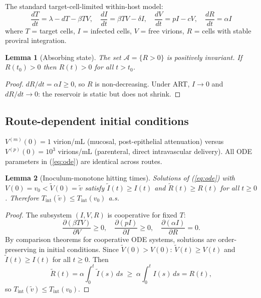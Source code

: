 \documentclass[11pt]{article}
\newtheorem{lemma}{Lemma}[section]
\theoremstyle{definition}
\theoremstyle{remark}
\newcommand{\Tint}{T_{\text{int}}}
\begin{document}
The standard target-cell-limited within-host model:
\begin{equation}
\frac{dT}{dt} = \lambda - dT - \beta TV, \quad
\frac{dI}{dt} = \beta TV - \delta I, \quad
\frac{dV}{dt} = pI - cV, \quad
\frac{dR}{dt} = \alpha I
\label{eq:ode}
\end{equation}
where $T$ = target cells, $I$ = infected cells, $V$ = free virions, $R$ = cells with stable proviral integration.

\begin{lemma}[Absorbing state]\label{lem:absorb}
The set $\mathcal{A} = \{R > 0\}$ is positively invariant. If $R(t_{0}) > 0$ then $R(t) > 0$ for all $t > t_{0}$.
\end{lemma}

\begin{proof}
$dR/dt = \alpha I \geq 0$, so $R$ is non-decreasing. Under ART, $I \to 0$ and $dR/dt \to 0$: the reservoir is static but does not shrink.
\end{proof}

\subsection{Route-dependent initial conditions}

$V^{(m)}(0) = 1$ virion/mL (mucosal, post-epithelial attenuation) versus $V^{(p)}(0) = 10^{3}$ virions/mL (parenteral, direct intravascular delivery). All ODE parameters in (\ref{eq:ode}) are identical across routes.

\begin{lemma}[Inoculum-monotone hitting times]\label{lem:monotone}
Solutions of (\ref{eq:ode}) with $V(0) = v_{0} < \tilde{V}(0) = \tilde{v}$ satisfy $\tilde{I}(t) \geq I(t)$ and $\tilde{R}(t) \geq R(t)$ for all $t \geq 0$. Therefore $\Tint(\tilde{v}) \leq \Tint(v_{0})$ a.s.
\end{lemma}

\begin{proof}
The subsystem $(I, V, R)$ is cooperative for fixed $T$:
\[
\frac{\partial(\beta TV)}{\partial V} \geq 0, \quad
\frac{\partial(pI)}{\partial I} \geq 0, \quad
\frac{\partial(\alpha I)}{\partial R} = 0.
\]
By comparison theorems for cooperative ODE systems\cite{smith1995}, solutions are order-preserving in initial conditions. Since $\tilde{V}(0) > V(0)$: $\tilde{V}(t) \geq V(t)$ and $\tilde{I}(t) \geq I(t)$ for all $t \geq 0$. Then
\[
\tilde{R}(t) = \alpha \int_{0}^{t} \tilde{I}(s)\,ds \;\geq\; \alpha \int_{0}^{t} I(s)\,ds = R(t),
\]
so $\Tint(\tilde{v}) \leq \Tint(v_{0})$.
\end{proof}
\end{document}
